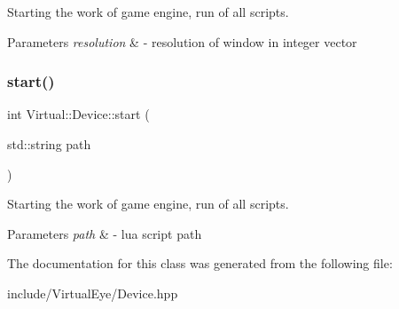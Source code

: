 Starting the work of game engine, run of all scripts. 


\begin{DoxyParams}{Parameters}
{\em resolution} & -\/ resolution of window in integer vector \\
\hline
\end{DoxyParams}
\hypertarget{class_virtual_1_1_device_aaadbfd2dd970af7a42a858ee52d36869}{}\label{class_virtual_1_1_device_aaadbfd2dd970af7a42a858ee52d36869} 
\subsubsection{\texorpdfstring{start()}{start()}}
{\footnotesize\ttfamily int Virtual\+::\+Device\+::start (\begin{DoxyParamCaption}\item[{std\+::string}]{path }\end{DoxyParamCaption})}



Starting the work of game engine, run of all scripts. 


\begin{DoxyParams}{Parameters}
{\em path} & -\/ lua script path \\
\hline
\end{DoxyParams}


The documentation for this class was generated from the following file\+:\begin{DoxyCompactItemize}
\item 
include/\+Virtual\+Eye/Device.\+hpp\end{DoxyCompactItemize}
